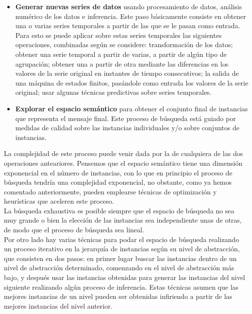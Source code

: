 \documentclass[10pt,a4paper]{article}
\begin{document}
\begin{itemize}
\item \textbf{Generar nuevas series de datos} usando procesamiento de datos, análisis numérico de los datos e inferencia. Este paso básicamente consiste en obtener una o varias series temporales a partir de las que se le pasan como entrada. Para esto se puede aplicar sobre estas series temporales las siguientes operaciones, combinadas según se considere: transformación de los datos; obtener una serie temporal a partir de varias, a partir de algún tipo de agrupación; obtener una a partir de otra mediante las diferencias en los valores de la serie original en instantes de tiempo consecutivos; la salida de una máquina de estados finitos, pasándole como entrada los valores de la serie original; usar algunas técnicas predictivas sobre series temporales.
\item \textbf{Explorar el espacio semántico} para obtener el conjunto final de instancias que representa el mensaje final. Este proceso de búsqueda está guiado por medidas de calidad sobre las instancias individuales y/o sobre conjuntos de instancias.
\end{itemize}

La complejidad de este proceso puede venir dada por la de cualquiera de las dos operaciones anteariores. Pensemos que el espacio semántico tiene una dimensión exponencial en el número de instancias, con lo que en principio el proceso de búsqueda tendría una complejidad exponencial, no obstante, como ya hemos comentado anteriormente, pueden emplearse técnicas de optimización y heurísticas que aceleren este proceso.\\

La búsqueda exhaustiva es posible siempre que el espacio de búsqueda no sea muy grande o bien la elección de las instancias sea independiente unas de otras, de modo que el proceso de búsqueda sea lineal.\\

Por otro lado hay varias técnicas para podar el espacio de búsqueda realizando un proceso iterativo en la jerarquía de instancias según su nivel de abstracción, que consisten en dos pasos: en primer lugar buscar las instancias dentro de un nivel de abstracción determinado, comenzando en el nivel de abstracción más bajo, y después usar las instancias obtenidas para generar las instancias del nivel siguiente realizando algún proceso de inferencia. Estas técnicas asumen que las mejores instancias de un nivel pueden ser obtenidas infiriendo a partir de las mejores instancias del nivel anterior.
\end{document}
